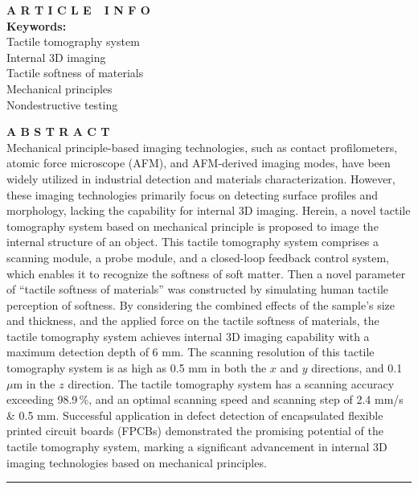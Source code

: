 \documentclass[11pt]{article}
\begin{document}
\noindent
\begin{minipage}[t]{0.28\textwidth}
\textbf{A R T I C L E\ \ I N F O}\\[0.8em]
\textbf{Keywords:}\\
Tactile tomography system\\
Internal 3D imaging\\
Tactile softness of materials\\
Mechanical principles\\
Nondestructive testing
\end{minipage}
\hfill
\begin{minipage}[t]{0.68\textwidth}
\textbf{A B S T R A C T}\\[0.8em]
Mechanical principle-based imaging technologies, such as contact
profilometers, atomic force microscope (AFM), and AFM-derived
imaging modes, have been widely utilized in industrial detection
and materials characterization. However, these imaging technologies
primarily focus on detecting surface profiles and morphology,
lacking the capability for internal 3D imaging. Herein, a novel
tactile tomography system based on mechanical principle is proposed
to image the internal structure of an object. This tactile
tomography system comprises a scanning module, a probe module,
and a closed-loop feedback control system, which enables it to
recognize the softness of soft matter. Then a novel parameter of
``tactile softness of materials'' was constructed by simulating
human tactile perception of softness. By considering the combined
effects of the sample's size and thickness, and the applied force
on the tactile softness of materials, the tactile tomography system
achieves internal 3D imaging capability with a maximum detection
depth of 6 mm. The scanning resolution of this tactile tomography
system is as high as 0.5 mm in both the $x$ and $y$ directions,
and 0.1 $\mu$m in the $z$ direction. The tactile tomography system
has a scanning accuracy exceeding 98.9\,\%, and an optimal scanning
speed and scanning step of 2.4 mm/s \& 0.5 mm. Successful
application in defect detection of encapsulated flexible printed
circuit boards (FPCBs) demonstrated the promising potential of the
tactile tomography system, marking a significant advancement in
internal 3D imaging technologies based on mechanical principles.
\end{minipage}

\vspace{1.2em}
\hrule
\vspace{0.8em}
\end{document}
